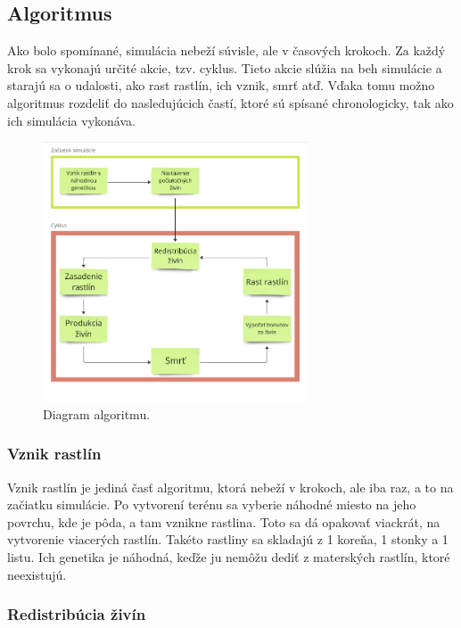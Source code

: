 \documentclass[12pt]{article}
\begin{document}
\newpage
\subsection{Algoritmus}

Ako bolo spomínané, simulácia nebeží súvisle, ale v časových krokoch.
Za každý krok sa vykonajú určité akcie, tzv. cyklus. Tieto akcie slúžia na beh
simulácie a starajú sa o udalosti, ako rast rastlín, ich vznik, smrť atď.
Vďaka tomu možno algoritmus rozdeliť do nasledujúcich častí, ktoré sú spísané
chronologicky, tak ako ich simulácia vykonáva.

\begin{figure}[ht]
	\centering
	\includegraphics[width=0.7\textwidth]{res/diagram_algoritmu.png}
	\caption{Diagram algoritmu.}
\end{figure}

\subsubsection{Vznik rastlín}

Vznik rastlín je jediná časť algoritmu, ktorá nebeží v krokoch, ale iba raz, a to na začiatku
simulácie. Po vytvorení terénu sa vyberie náhodné miesto na jeho povrchu, kde
je pôda, a tam vznikne rastlina. Toto sa dá opakovať viackrát, na vytvorenie
viacerých rastlín. Takéto rastliny sa skladajú z 1 koreňa, 1 stonky a 1 listu.
Ich genetika je náhodná, keďže ju nemôžu dediť z materských rastlín, ktoré
neexistujú.

\subsubsection{Redistribúcia živín}
\end{document}
